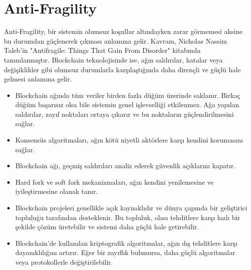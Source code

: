 \section{Anti-Fragility}

Anti-Fragility, bir sistemin olumsuz koşullar altındayken zarar görmemesi aksine bu durumdan güçlenerek çıkması anlamına gelir. Kavram, Nicholas Nassim Taleb'in "Antifragile: Things That Gain From Disorder" kitabında tanımlanmıştır. Blockchain teknolojisinde ise, ağın saldırılar, hatalar veya değişiklikler gibi olumsuz durumlarla karşılaştığında daha dirençli ve güçlü hale gelmesi anlamına gelir.

\begin{itemize}
    \item Blockchain ağında tüm veriler birden fazla düğüm üzerinde saklanır. Birkaç düğüm başarısız olsa bile sistemin genel işlevselliği etkilenmez. Ağa yapılan saldırılar, zayıf noktaları ortaya çıkarır ve bu noktaların güçlendirilmesini sağlar.
    \item Konsensüs algoritmaları, ağın kötü niyetli aktörlere karşı kendini korumasını sağlar.
    \item Blockchain ağı, geçmiş saldırıları analiz ederek güvenlik açıklarını kapatır.
    \item Hard fork ve soft fork mekanizmaları, ağın kendini yenilemesine ve iyileştirmesine olanak tanır.
    \item Blockchain projeleri genellikle açık kaynaklıdır ve dünya çapında bir geliştirici topluluğu tarafından desteklenir. Bu topluluk, olası tehditlere karşı hızlı bir şekilde çözüm üretebilir ve sistemi daha güçlü hale getirebilir.
    \item Blockchain'de kullanılan kriptografik algoritmalar, ağın dış tehditlere karşı dayanıklılığını artırır. Eğer bir zayıflık bulunursa, daha güçlü algoritmalar veya protokollerle değiştirilebilir.
\end{itemize}

\newpage